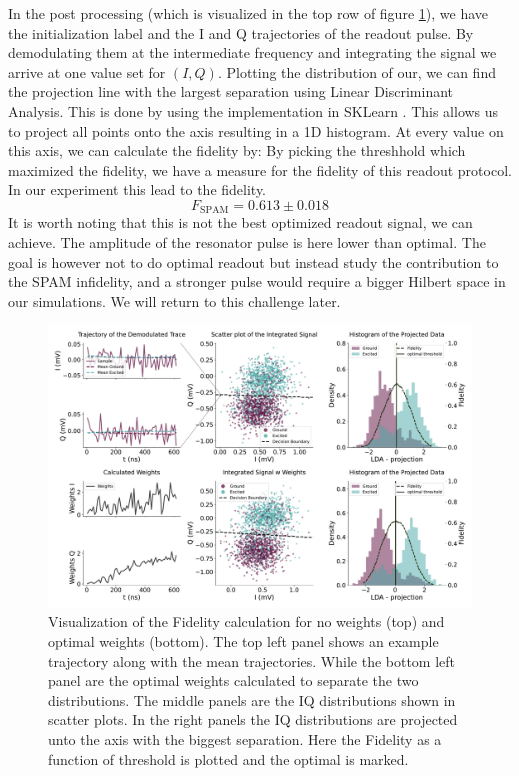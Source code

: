 In the post processing (which is visualized in the top row of figure \ref{fig:readout_process}), we have the initialization label and the I and Q trajectories of the readout pulse. By demodulating them at the intermediate frequency and integrating the signal we arrive at one value set for $(I, Q)$. Plotting the distribution of our, we can find the projection line with the largest separation using Linear Discriminant Analysis. This is done by using the implementation in SKLearn \cite{sklearn}. This allows us to project all points onto the axis resulting in a 1D histogram. At every value on this axis, we can calculate the fidelity by:
 By picking the threshhold which maximized the fidelity, we have a measure for the fidelity of this readout protocol. In our experiment this lead to the fidelity.
\begin{equation}
    F_{\text{SPAM}} = 0.613\pm 0.018
\end{equation}
It is worth noting that this is not the best optimized readout signal, we can achieve. The amplitude of the resonator pulse is here lower than optimal. The goal is however not to do optimal readout but instead study the contribution to the SPAM infidelity, and a stronger pulse would require a bigger Hilbert space in our simulations. We will return to this challenge later.
\begin{figure}[t]
    \centering
    \includegraphics{Readout/Figs/Introduction.pdf}
    \caption{Visualization of the Fidelity calculation for no weights (top) and optimal weights (bottom). The top left panel shows an example trajectory along with the mean trajectories. While the bottom left panel are the optimal weights calculated to separate the two distributions. The middle panels are the IQ distributions shown in scatter plots. In the right panels the IQ distributions are projected unto the axis with the biggest separation. Here the Fidelity as a function of threshold is plotted and the optimal is marked.}
    \label{fig:readout_process}
\end{figure}



